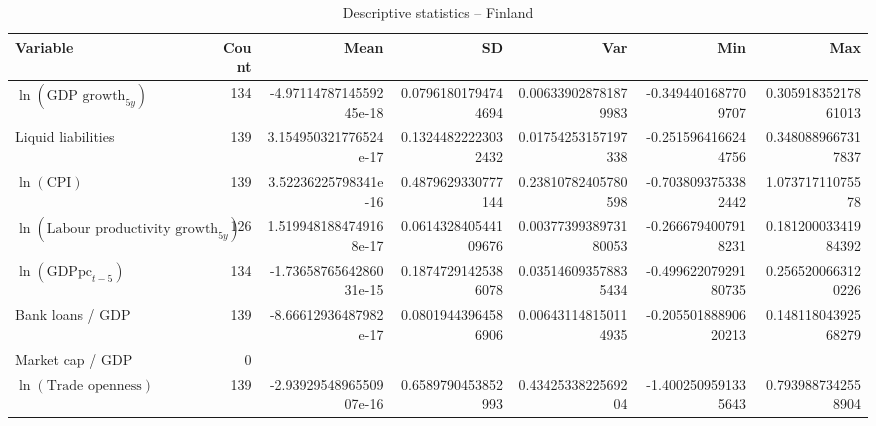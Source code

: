 \begin{table}[!htbp]
\centering
\caption{Descriptive statistics -- Finland}
\footnotesize
\begin{tabular}{lrrrrrr}
\toprule
Variable & Count & Mean & SD & Var & Min & Max \\
\midrule
$\ln(\text{GDP growth}_{5y})$ & 134 & -4.9711478714559245e-18 & 0.07961801794744694 & 0.006339028781879983 & -0.3494401687709707 & 0.30591835217861013 \\
Liquid liabilities & 139 & 3.154950321776524e-17 & 0.13244822223032432 & 0.01754253157197338 & -0.2515964166244756 & 0.3480889667317837 \\
$\ln(\text{CPI})$ & 139 & 3.52236225798341e-16 & 0.4879629330777144 & 0.23810782405780598 & -0.7038093753382442 & 1.07371711075578 \\
$\ln(\text{Labour productivity growth}_{5y})$ & 126 & 1.5199481884749168e-17 & 0.061432840544109676 & 0.0037739938973180053 & -0.2666794007918231 & 0.18120003341984392 \\
$\ln(\text{GDPpc}_{t-5})$ & 134 & -1.7365876564286031e-15 & 0.18747291425386078 & 0.035146093578835434 & -0.49962207929180735 & 0.2565200663120226 \\
Bank loans / GDP & 139 & -8.66612936487982e-17 & 0.08019443964586906 & 0.006431148150114935 & -0.20550188890620213 & 0.14811804392568279 \\
Market cap / GDP & 0 &  &  &  &  &  \\
$\ln(\text{Trade openness})$ & 139 & -2.9392954896550907e-16 & 0.6589790453852993 & 0.4342533822569204 & -1.4002509591335643 & 0.7939887342558904 \\
\bottomrule
\end{tabular}
\end{table}


